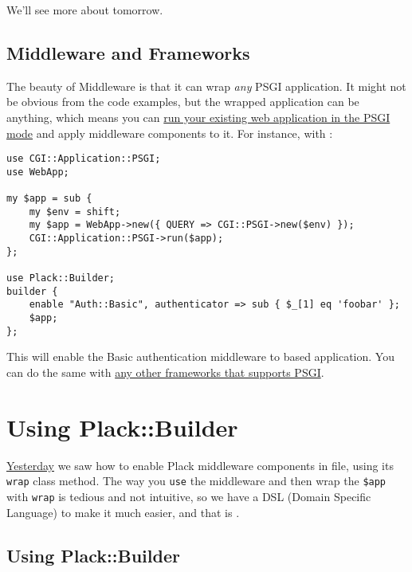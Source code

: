 We'll see more about  tomorrow.

\section{Middleware and Frameworks}\label{middleware-and-frameworks}

The beauty of Middleware is that it can wrap \emph{any} PSGI
application. It might not be obvious from the code examples, but the
wrapped application can be anything, which means you can
\href{http://advent.plackperl.org/2009/12/day-7-use-web-application-framework-in-psgi.html}{run
your existing web application in the PSGI mode} and apply middleware
components to it. For instance, with :

\begin{lstlisting}
use CGI::Application::PSGI;
use WebApp;

my $app = sub {
    my $env = shift;
    my $app = WebApp->new({ QUERY => CGI::PSGI->new($env) });
    CGI::Application::PSGI->run($app);
};

use Plack::Builder;
builder {
    enable "Auth::Basic", authenticator => sub { $_[1] eq 'foobar' };
    $app;
};
\end{lstlisting}

This will enable the Basic authentication middleware to 
based application. You can do the same with
\href{http://plackperl.org/\#frameworks}{any other frameworks that
supports PSGI}.

\chapter{Using Plack::Builder}\label{day-11-using-plackbuilder}

\href{http://advent.plackperl.org/2009/12/day-10-using-plack-middleware.html}{Yesterday}
we saw how to enable Plack middleware components in  file, using
its \lstinline!wrap! class method. The way you \lstinline!use! the
middleware and then wrap the \lstinline!$app! with \lstinline!wrap! is
tedious and not intuitive, so we have a DSL (Domain Specific Language)
to make it much easier, and that is .

\section{Using Plack::Builder}\label{using-plackbuilder}

